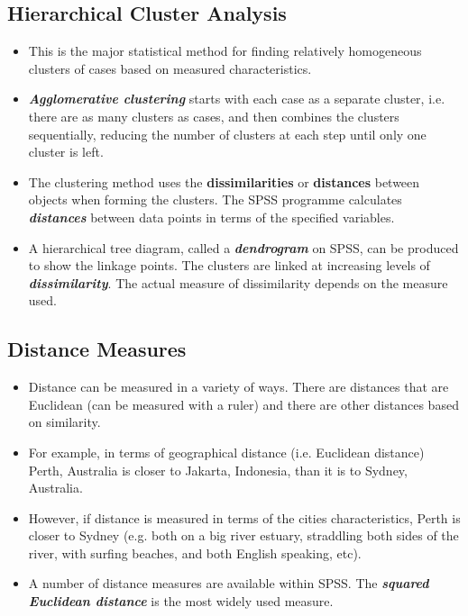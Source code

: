 \documentclass[a4paper,12pt]{article}
\begin{document}
\subsection{Hierarchical Cluster Analysis}
\begin{itemize}
	\item This is the major statistical method for finding relatively homogeneous clusters of cases based on measured characteristics.
	
\item \textbf{\textit{Agglomerative clustering}} starts with each case as a separate cluster, i.e. there are as many clusters as cases, and then combines the clusters sequentially, reducing the number of clusters at each step until only one cluster is left.
	
\item The clustering method uses the \textbf{dissimilarities} or \textbf{distances} between objects when forming the clusters. The SPSS programme calculates \textbf{\textit{distances}} between data points in terms of the specified variables.
	
\item A hierarchical tree diagram, called a \textbf{\textit{dendrogram }} on SPSS, can be produced to show the linkage points. The clusters are linked at increasing levels of \textbf{\textit{dissimilarity}}.
	The actual measure of dissimilarity depends on the measure used.
	
\end{itemize}


\subsection{Distance Measures}
\begin{itemize}
	\item Distance can be measured in a variety of ways. There are distances that are Euclidean (can be measured with a ruler) and there are other distances based on similarity.
	\item  For example, in terms of
	geographical distance (i.e. Euclidean distance) Perth, Australia is closer to Jakarta, Indonesia, than it is to Sydney, Australia.
	
\item However, if distance is measured in terms of the cities characteristics, Perth is closer to Sydney (e.g. both on a big river estuary, straddling both sides of the river, with surfing beaches, and both English speaking, etc). 
\item A number of distance measures are available within SPSS. The \textbf{\textit{squared Euclidean distance}} is the most widely used measure.
\end{itemize}
\end{document}
